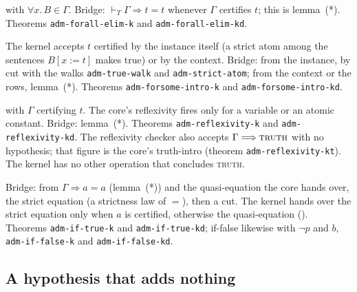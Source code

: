 with $\forall x.\,B \in \Gamma$.  Bridge: $\vdash_T \Gamma \Longrightarrow
t=t$ whenever $\Gamma$ certifies $t$; this is lemma~(*).  Theorems
\texttt{adm-forall-elim-k} and \texttt{adm-forall-elim-kd}.

The kernel accepts $t$ certified by the instance itself (a strict atom
among the sentences $B[x:=t]$ makes true) or by the context.  Bridge:
from the instance, by cut with the walks \texttt{adm-true-walk} and
\texttt{adm-strict-atom}; from the context or the rows, lemma~(*).  Theorems
\texttt{adm-forsome-intro-k} and \texttt{adm-forsome-intro-kd}.

with $\Gamma$ certifying $t$.  The core's reflexivity fires only for a
variable or an atomic constant.  Bridge: lemma~(*).  Theorems
\texttt{adm-reflexivity-k} and \texttt{adm-reflexivity-kd}.  The
reflexivity checker also accepts $\Gamma \Longrightarrow \textsc{truth}$
with no hypothesis; that figure is the core's truth-intro (theorem
\texttt{adm-reflexivity-kt}).  The kernel has no other operation that
concludes \textsc{truth}.

Bridge: from $\Gamma \Longrightarrow a = a$ (lemma~(*)) and the
quasi-equation the core hands over, the strict equation (a
strictness law of $=$), then a cut.  The kernel hands over the strict
equation only when $a$ is certified, otherwise the quasi-equation
().  Theorems \texttt{adm-if-true-k} and
\texttt{adm-if-true-kd}; if-false likewise with $\neg p$ and $b$,
\texttt{adm-if-false-k} and \texttt{adm-if-false-kd}.

\subsection{A hypothesis that adds nothing}

